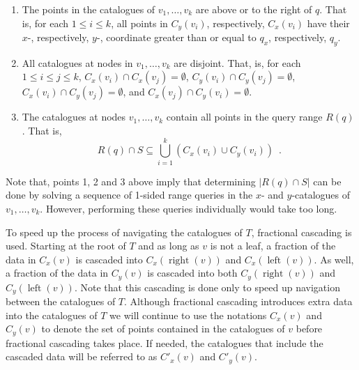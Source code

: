 \documentclass[charterfonts]{patmorin}
\DeclareMathOperator{\lft}{left}
\DeclareMathOperator{\rght}{right}
\begin{document}
\begin{enumerate}

\item The points in the catalogues of $v_1,\ldots,v_k$ are above or to
the right of $q$.  That is, for each $1\le i \le k$, all points in
$C_y(v_i)$, respectively, $C_x(v_i)$ have their $x$-, respectively,
$y$-, coordinate greater than or equal to $q_x$, respectively, $q_y$.

\item All catalogues at nodes in $v_1,\ldots,v_k$ are disjoint.  That,
is, for each $1\le i\le j \le k$,
$C_x(v_i)\cap C_x(v_j) = \emptyset$,
$C_y(v_i)\cap C_y(v_j) = \emptyset$,
$C_x(v_i)\cap C_y(v_j) = \emptyset$, and
$C_x(v_j)\cap C_y(v_i) = \emptyset$.

\item The catalogues at nodes $v_1,\ldots,v_k$ contain all points in
the query range $R(q)$.  That is,
\[
     R(q)\cap S \subseteq \bigcup_{i=1}^k \left(C_x(v_i)\cup C_y(v_i)\right)
        \enspace . 
\]
\end{enumerate}

Note that, points 1, 2 and 3 above imply that determining $|R(q)\cap
S|$ can be done by solving a sequence of 1-sided range queries in the
$x$- and $y$-catalogues of $v_1,\ldots,v_k$.  However, performing these queries
individually would take too long.

To speed up the process of navigating the catalogues of $T$,
fractional cascading \cite{ae76} is used.  Starting at the root of $T$ and as long as $v$ is
not a leaf, a fraction of the data in $C_x(v)$ is cascaded into
$C_x(\rght(v))$ and $C_x(\lft(v))$.  As well, a fraction of the data
in $C_y(v)$ is cascaded into both $C_y(\rght(v))$ and $C_y(\lft(v))$.
%
%
%
%
%
Note that this
cascading is done only to speed up navigation between the catalogues
of $T$.  Although fractional cascading introduces extra data into the
catalogues of $T$ we will continue to use the notations $C_x(v)$ and
$C_y(v)$ to denote the set of points contained in the catalogues of
$v$ before fractional cascading takes place.  If needed, the catalogues
that include the cascaded data will be referred to as $C'_x(v)$ and
$C'_y(v)$.
\end{document}
